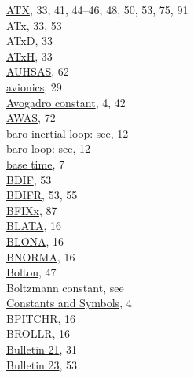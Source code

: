 \documentclass[
]{book}
\begin{document}
\href{./4-the-state-of-the-atmosphere.html\#ambient-t}{ATX}, 33, 41, 44--46, 48, 50, 53, 75, 91\\
\href{./4-the-state-of-the-atmosphere.html\#ambient-t}{ATx}, 33, 53\\
\href{./4-the-state-of-the-atmosphere.html\#ambient-t}{ATxD}, 33\\
\href{./4-the-state-of-the-atmosphere.html\#ambient-t}{ATxH}, 33\\
\href{./5-cloud-physics-variables.html\#CRPC}{AUHSAS}, 62\\
\href{./4-the-state-of-the-atmosphere.html\#psx}{avionics}, 29\\
\href{./1-introduction.html\#constants-and-symbols}{Avogadro constant}, 4, 42\\
\href{./6-air-chemistry-measurements.html\#awas-cims-qcls-toga}{AWAS}, 72\\
\href{./3-the-state-of-the-aircraft.html\#wp3}{baro-inertial loop: see}, 12\\
\href{./3-the-state-of-the-aircraft.html\#wp3}{baro-loop: see}, 12\\
\href{./2-general-information-about-data-files.html\#base-time}{base time}, 7\\
\href{./4-the-state-of-the-atmosphere.html\#bdifr}{BDIF}, 53\\
\href{./4-the-state-of-the-atmosphere.html\#bdifr}{BDIFR}, 53, 55\\
\href{./10-obsolete-variables.html\#vanes}{BFIXx}, 87\\
\href{./3-the-state-of-the-aircraft.html\#blata}{BLATA}, 16\\
\href{./3-the-state-of-the-aircraft.html\#blona}{BLONA}, 16\\
\href{./3-the-state-of-the-aircraft.html\#bnorma}{BNORMA}, 16\\
\href{./3-the-state-of-the-aircraft.html\#thetae}{Bolton}, 47\\
Boltzmann constant, see\\
\hspace*{0.333em}\hspace*{0.333em}\href{./1-introduction.html\#constants-and-symbols}{Constants and Symbols}, 4\\
\href{./3-the-state-of-the-aircraft.html\#bpitchr}{BPITCHR}, 16\\
\href{./3-the-state-of-the-aircraft.html\#brollr}{BROLLR}, 16\\
\href{./4-the-state-of-the-atmosphere.html\#qcx}{Bulletin 21}, 31\\
\href{./4-the-state-of-the-atmosphere.html\#wind}{Bulletin 23}, 53\\
\end{document}
